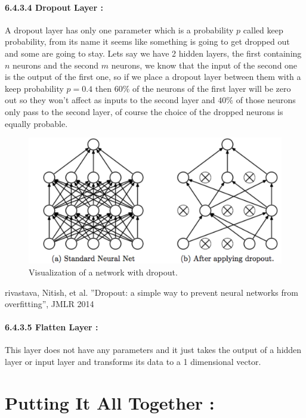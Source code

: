 \documentclass[10pt,a4paper]{article}
\begin{document}
\paragraph{6.4.3.4 Dropout Layer :}
A dropout layer has only one parameter which is a probability $ p $ called keep probability, from its name it seems like something is going to get dropped out and some are going to stay. Lets say we have 2 hidden layers, the first containing $ n $ neurons and the second $ m $ neurons, we know that the input of the second one is the output of the first one, so if we place a dropout layer between them with a keep probability $ p = 0.4 $ then $ 60\% $ of the neurons of the first layer will be zero out so they won't affect as inputs to the second layer and $ 40\% $ of those neurons only pass to the second layer, of course the choice of the dropped neurons is equally probable.
\begin{figure}[H]
\centering
\includegraphics[scale=0.4]{dropout.png}
\caption{Visualization of a network with dropout.}
\end{figure}
\begin{center}
\small rivastava, Nitish, et al. ”Dropout: a simple way to prevent neural networks from
overfitting”, JMLR 2014
\end{center}
\paragraph{6.4.3.5 Flatten Layer :}
This layer does not have any parameters and it just takes the output of a hidden layer or input layer and transforms its data to a 1 dimensional vector.

\section{Putting It All Together :}
\end{document}
